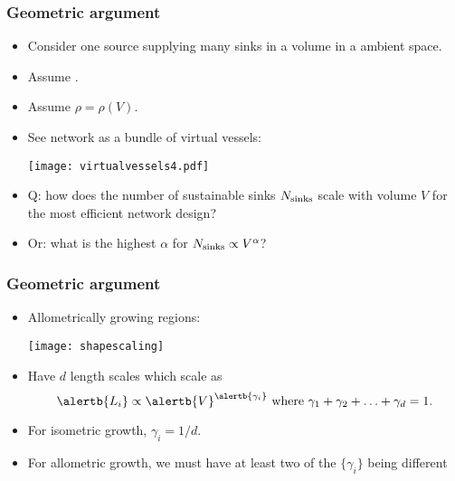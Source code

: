 \begin{frame}
  \frametitle{Geometric argument}

  \begin{itemize}
  \item<1-> 
    Consider \alert{one source} supplying \alert{many sinks} in a  volume
    in a  ambient space.
  \item<1->
    Assume .
  \item<1->
    Assume \alert{$\rho = \rho(V)$}.
  \item<2-> 
    See network as a bundle of virtual vessels:
    \begin{center}
      \begin{overprint}
        \texttt{[image: virtualvessels4.pdf]}
      \end{overprint}
    \end{center}
  \item<3-> 
    \alert{Q:} how does the number of sustainable
    sinks $N_{\textnormal{sinks}}$
    scale with volume $V$ for the most efficient network design?
  \item<4-> 
    \alert{Or:} what is the highest $\alpha$ for $N_{\textnormal{sinks}} \propto V^{\alpha}$?
  \end{itemize}

\end{frame}

\begin{frame}
  \frametitle{Geometric argument}

  \begin{itemize}
  \item<1-> Allometrically growing regions:
  \begin{center}
    \texttt{[image: shapescaling]}    
  \end{center}
  \bigskip
  \item<1-> Have $d$ length scales which scale
    as 
    {
      $$
      \alertb{L_i} \propto \alertb{V}^{\alertb{\gamma_i}}
      \mbox{\ where $\gamma_1 + \gamma_2 + \ldots + \gamma_d = 1$.}
      $$
    }
  \item<1-> 
    For \alert{isometric} growth, $\gamma_i = 1/d$.
  \item<1->
    For \alert{allometric} growth, 
    we must have at least two of the $\{\gamma_i\}$ being different
  \end{itemize}

\end{frame}


